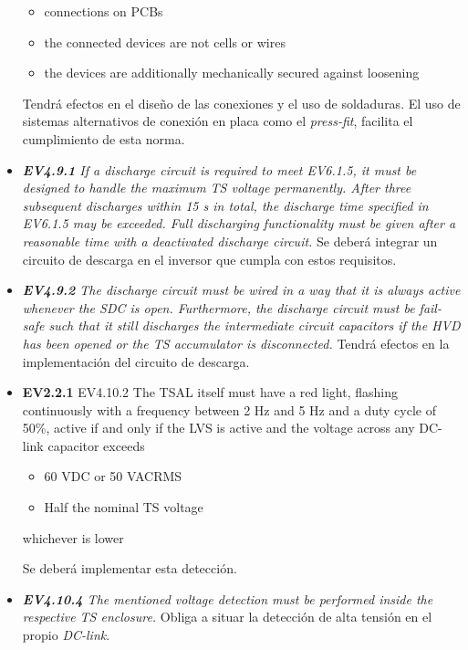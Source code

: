 \begin{itemize}
\begin{itquote}
    \begin{itemize}
            \item connections on PCBs
            \item the connected devices are not cells or wires
            \item the devices are additionally mechanically secured against loosening
    \end{itemize} \end{itquote} Tendrá efectos en el diseño de las conexiones y el uso de soldaduras. El uso de sistemas alternativos de conexión en placa como el \textit{press-fit}, facilita el cumplimiento de esta norma.
    \item \textit{\textbf{EV4.9.1} If a discharge circuit is required to meet EV6.1.5, it must be designed to handle the maximum TS voltage permanently. After three subsequent discharges within 15 s in total, the discharge time specified in EV6.1.5 may be exceeded.  Full discharging functionality must be given after a reasonable time with a deactivated discharge circuit.} Se deberá integrar un circuito de descarga en el inversor que cumpla con estos requisitos.
    \item \textit{\textbf{EV4.9.2} The discharge circuit must be wired in a way that it is always active whenever the SDC is open. Furthermore, the discharge circuit must be fail-safe such that it still discharges the intermediate circuit capacitors if the HVD has  been opened or the TS accumulator is disconnected.} Tendrá efectos en la implementación del circuito de descarga.
    \item \begin{itquote} \textbf{EV2.2.1} EV4.10.2 The TSAL itself must have a red light, flashing continuously with a frequency between 2 Hz and 5 Hz and a duty cycle of 50\%, active if and only if the LVS is active and the voltage across any DC-link capacitor exceeds 
    \begin{itemize}
            \item 60 VDC or 50 VACRMS
            \item Half the nominal TS voltage
    \end{itemize} 
    whichever is lower \end{itquote} Se deberá implementar esta detección.
    \item \textit{\textbf{EV4.10.4} The mentioned voltage detection must be performed inside the respective TS enclosure.} Obliga a situar la detección de alta tensión en el propio \textit{DC-link}.

\end{itemize}

